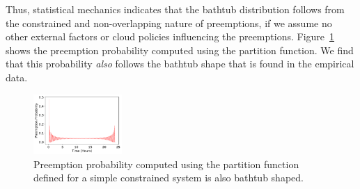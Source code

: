 Thus, statistical mechanics indicates that the bathtub distribution follows from the constrained and non-overlapping nature of preemptions, if we assume no other external factors or cloud policies influencing the preemptions. 
Figure~\ref{fig:partfun} shows the preemption probability computed using the partition function.
We find that this probability \emph{also} follows the bathtub shape that is found in the empirical data. 




\begin{figure}[t]
  \centering
  \includegraphics[width=0.3\textwidth]{../graphs/analytical_prob.pdf}
  \caption{Preemption probability computed using the partition function defined for a simple constrained system is also bathtub shaped.}
  \label{fig:partfun}
\end{figure}

 


